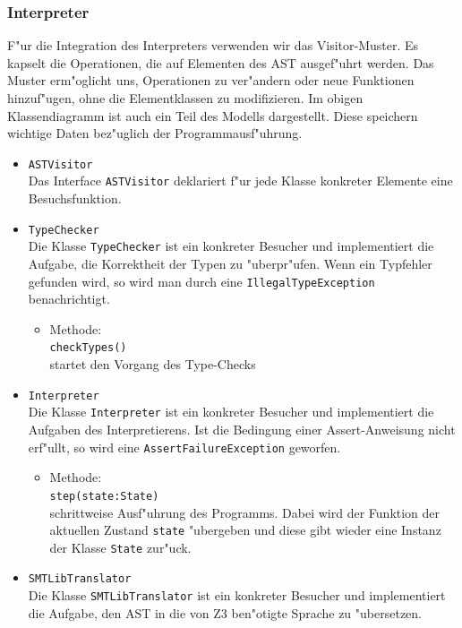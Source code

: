\documentclass[10pt,a4paper,titlepage]{article}
\begin{document}
\subsubsection{Interpreter}

F"ur die Integration des Interpreters verwenden wir das Visitor-Muster. Es kapselt die Operationen, die auf Elementen des AST ausgef"uhrt werden. Das Muster erm"oglicht uns, Operationen zu ver"andern oder neue Funktionen hinzuf"ugen, ohne die Elementklassen zu modifizieren. Im obigen Klassendiagramm ist auch ein Teil des Modells dargestellt. Diese speichern wichtige Daten bez"uglich der Programmausf"uhrung. 
\begin{itemize}
\item \texttt{ASTVisitor} \\
Das Interface \texttt{ASTVisitor} deklariert f"ur jede Klasse konkreter Elemente eine Besuchsfunktion.
\item \texttt{TypeChecker} \\
Die Klasse \texttt{TypeChecker} ist ein konkreter Besucher und implementiert die Aufgabe, die Korrektheit der Typen zu "uberpr"ufen. Wenn ein Typfehler gefunden wird, so wird man durch eine \texttt{IllegalTypeException} benachrichtigt. 
\begin{itemize}
\item Methode: \\
\texttt{checkTypes()} \\
startet den Vorgang des Type-Checks 
\end{itemize}
\item \texttt{Interpreter} \\
Die Klasse \texttt{Interpreter} ist ein konkreter Besucher und implementiert die Aufgaben des Interpretierens. Ist die Bedingung einer Assert-Anweisung nicht erf"ullt, so wird eine \texttt{AssertFailureException} geworfen.
\begin{itemize}
\item Methode: \\
\texttt{step(state:State)} \\
schrittweise Ausf"uhrung des Programms. Dabei wird der Funktion der aktuellen Zustand \texttt{state} "ubergeben und diese gibt wieder eine Instanz der Klasse \texttt{State} zur"uck. 
\end{itemize}
\item \texttt{SMTLibTranslator} \\
Die Klasse \texttt{SMTLibTranslator} ist ein konkreter Besucher und implementiert die Aufgabe, den AST in die von Z3 ben"otigte Sprache zu "ubersetzen.

\end{itemize}
\end{document}
